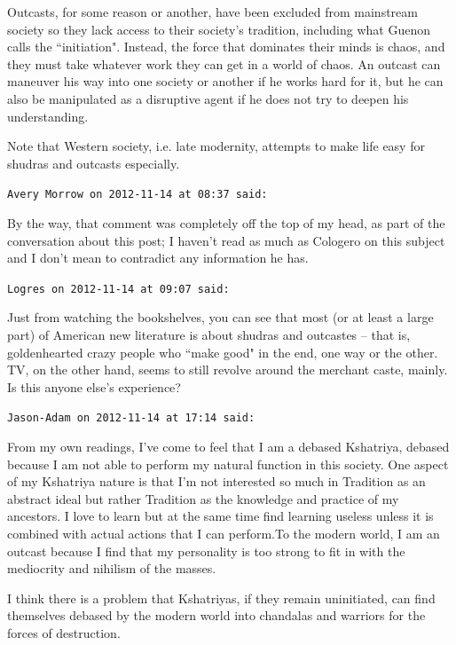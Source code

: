 \begin{footnotesize}
\begin{sffamily}
Outcasts, for some reason or another, have been excluded from mainstream society so they lack access to their society's tradition, including what Guenon calls the ``initiation". Instead, the force that dominates their minds is chaos, and they must take whatever work they can get in a world of chaos. An outcast can maneuver his way into one society or another if he works hard for it, but he can also be manipulated as a disruptive agent if he does not try to deepen his understanding.

Note that Western society, i.e. late modernity, attempts to make life easy for shudras and outcasts especially.


\hfill

\texttt{Avery Morrow on 2012-11-14 at 08:37 said: }

By the way, that comment was completely off the top of my head, as part of the conversation about this post; I haven't read as much as Cologero on this subject and I don't mean to contradict any information he has.


\hfill

\texttt{Logres on 2012-11-14 at 09:07 said: }

Just from watching the bookshelves, you can see that most (or at least a large part) of American new literature is about shudras and outcastes – that is, goldenhearted crazy people who ``make good" in the end, one way or the other. TV, on the other hand, seems to still revolve around the merchant caste, mainly. Is this anyone else's experience?


\hfill

\texttt{Jason-Adam on 2012-11-14 at 17:14 said: }

From my own readings, I've come to feel that I am a debased Kshatriya, debased because I am not able to perform my natural function in this society. One aspect of my Kshatriya nature is that I'm not interested so much in Tradition as an abstract ideal but rather Tradition as the knowledge and practice of my ancestors. I love to learn but at the same time find learning useless unless it is combined with actual actions that I can perform.To the modern world, I am an outcast because I find that my personality is too strong to fit in with the mediocrity and nihilism of the masses. 

I think there is a problem that Kshatriyas, if they remain uninitiated, can find themselves debased by the modern world into chandalas and warriors for the forces of destruction.


\hfill


\end{sffamily}
\end{footnotesize}
